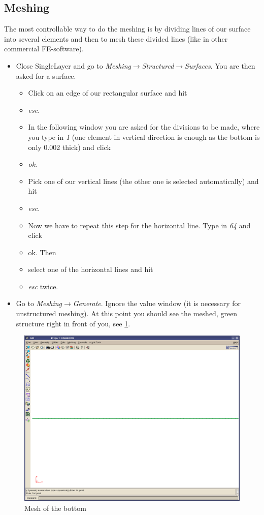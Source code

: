 \subsection{Meshing}

The most controllable way to do the meshing is by dividing lines of
our surface into several elements and then to mesh these divided lines
(like in other commercial FE-software).

\begin{itemize}
\item Close SingleLayer and go to \emph{Meshing$\to$Structured$\to$Surfaces}.
You are then asked for a surface. 

\begin{itemize}
\item Click on an edge of our rectangular surface and hit 
\item \emph{esc}.
\item In the following window you are asked for the divisions to be made,
where you type in \emph{1} (one element in vertical direction is enough
as the bottom is only 0.002 thick) and click 
\item \emph{ok}. 
\item Pick one of our vertical lines (the other one is selected automatically)
and hit 
\item \emph{esc}.
\item Now we have to repeat this step for the horizontal line. Type in \emph{64}
and click 
\item ok. Then 
\item select one of the horizontal lines and hit 
\item \emph{esc} twice. 
\end{itemize}
\item Go to \emph{Meshing$\to$Generate}. Ignore the value window (it is
necessary for unstructured meshing). At this point you should see
the meshed, green structure right in front of you, see \ref{tut_fsi:3.2}.
\end{itemize}
%
\begin{figure}[h]
\includegraphics[width=1\columnwidth]{Bilder/structure_02}


\caption{\label{tut_fsi:3.2} Mesh of the bottom}
\end{figure}


